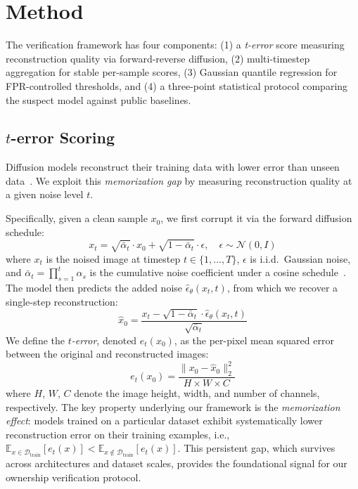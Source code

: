 \documentclass{article}
\begin{document}
\section{Method}
\label{sec:method}

The verification framework has four components: 
(1) a \emph{t-error} score measuring reconstruction quality via forward-reverse diffusion, 
(2) multi-timestep aggregation for stable per-sample scores, (3) Gaussian quantile regression for FPR-controlled thresholds, 
and (4) a three-point statistical protocol comparing the suspect model against public baselines.

\subsection{$t$-error Scoring}
\label{sec:t_error}

Diffusion models reconstruct their training data with lower error than unseen data~\citep{carlini2023extracting}. We exploit this \emph{memorization gap} by measuring reconstruction quality at a given noise level $t$.

Specifically, given a clean sample $x_0$, we first corrupt it via the forward diffusion schedule:
\begin{equation}
x_t = \sqrt{\bar{\alpha}_t} \cdot x_0 + \sqrt{1 - \bar{\alpha}_t} \cdot \epsilon, \quad \epsilon \sim \mathcal{N}(0, I)
\end{equation}
where $x_t$ is the noised image at timestep $t \in \{1,\ldots,T\}$, $\epsilon$ is i.i.d.\ Gaussian noise, and $\bar{\alpha}_t = \prod_{s=1}^{t} \alpha_s$ is the cumulative noise coefficient under a cosine schedule~\citep{dhariwal2021diffusion}. The model then predicts the added noise $\hat{\epsilon}_\theta(x_t, t)$, from which we recover a single-step reconstruction:
\begin{equation}
\hat{x}_0 = \frac{x_t - \sqrt{1 - \bar{\alpha}_t} \cdot \hat{\epsilon}_\theta(x_t, t)}{\sqrt{\bar{\alpha}_t}}
\end{equation}
We define the \emph{$t$-error}, denoted $e_t(x_0)$, as the per-pixel mean squared error between the original and reconstructed images:
\begin{equation}
e_t(x_0) = \frac{\|x_0 - \hat{x}_0\|_2^2}{H \times W \times C}
\end{equation}
where $H$, $W$, $C$ denote the image height, width, and number of channels, respectively. The key property underlying our framework is the \emph{memorization effect}: models trained on a particular dataset exhibit systematically lower reconstruction error on their training examples, i.e., $\mathbb{E}_{x \in \mathcal{D}_{\mathrm{train}}}[e_t(x)] < \mathbb{E}_{x \notin \mathcal{D}_{\mathrm{train}}}[e_t(x)]$. This persistent gap, which survives across architectures and dataset scales, provides the foundational signal for our ownership verification protocol.
\end{document}
